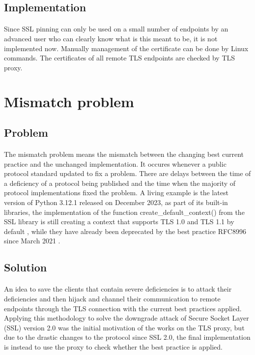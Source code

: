 \documentclass[mscthesis]{usiinfthesis}
\begin{document}
\subsection{Implementation}
\paragraph{}
Since SSL pinning can only be used on a small number of endpoints by an advanced user who can clearly know what is this meant to be, it is not implemented now. Manually management of the certificate can be done by Linux commands. The certificates of all remote TLS endpoints are checked by TLS proxy.

\section{Mismatch problem}
\subsection{Problem}
\paragraph{}
The mismatch problem means the mismatch between the changing best current practice and the unchanged implementation. It occures whenever a public protocol standard updated to fix a problem. There are delays between the time of a deficiency of a protocol being published and the time when the majority of protocol implementations fixed the problem. A living example is the latest version of Python 3.12.1 released on December 2023, as part of its built-in libraries, the implementation of the function create\_default\_context() from the SSL library is still creating a context that supports TLS 1.0 and TLS 1.1 by default \citep{pyton:ssl}, while they have already been deprecated by the best practice RFC8996 since March 2021 \citep{rfc:notls11}.

\subsection{Solution}
\paragraph{}
An idea to save the clients that contain severe deficiencies is to attack their deficiencies and then hijack and channel their communication to remote endpoints through the TLS connection with the current best practices applied. Applying this methodology to solve the downgrade attack of Secure Socket Layer (SSL) version 2.0 was the initial motivation of the works on the TLS proxy, but due to the drastic changes to the protocol since SSL 2.0, the final implementation is instead to use the proxy to check whether the best practice is applied.
\end{document}
